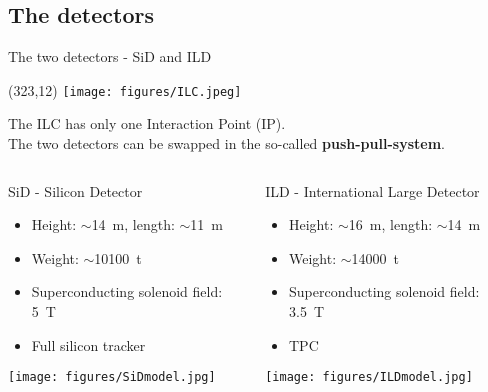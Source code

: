 \documentclass[xcolor={dvipsnames}]{beamer}
\newcommand{\ilclogo}{
  \setlength{\TPHorizModule}{1pt}
  \setlength{\TPVertModule}{1pt}
  \begin{textblock}{1}(323,12)
   \texttt{[image: figures/ILC.jpeg]}
  \end{textblock}
}
\begin{document}
\subsection{The detectors}
\begin{frame}{The two detectors - SiD and ILD}
\ilclogo
\begin{block}{}
The ILC has only one Interaction Point (IP).\\
The two detectors can be swapped in the so-called \textbf{push-pull-system}.
\end{block}

\begin{columns}
\begin{column}{0.48\textwidth}
\begin{center}
\alert{SiD - Silicon Detector}
\begin{itemize}
\item Height: $\sim$\SI{14}{\metre}, length:  $\sim$\SI{11}{\metre}
\item Weight: $\sim$\SI{10100}{\tonne}
\item Superconducting solenoid field: \SI{5}{\tesla}
\item Full silicon tracker
\end{itemize}

\texttt{[image: figures/SiDmodel.jpg]}

\end{center}
\end{column}

\begin{column}{0.48\textwidth}
\begin{center}
\alert{ILD - International Large Detector}
\begin{itemize}
\item Height: $\sim$\SI{16}{\metre}, length:  $\sim$\SI{14}{\metre}
\item Weight: $\sim$\SI{14000}{\tonne}
\item Superconducting solenoid field: \SI{3.5}{\tesla}
\item TPC
\end{itemize}

\texttt{[image: figures/ILDmodel.jpg]}

\end{center}
\end{column}
\end{columns}

\end{frame}
\end{document}
